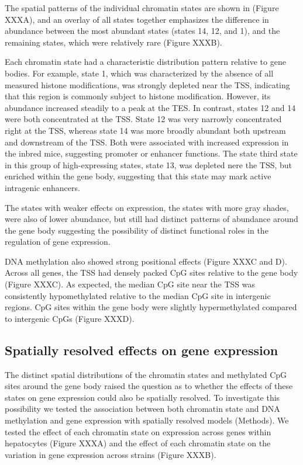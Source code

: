 \documentclass[10pt,letterpaper]{article}
\begin{document}
The spatial patterns of the individual chromatin states are shown in
(Figure XXXA), and an overlay of all states together emphasizes the
difference in abundance between the most abundant states (states 14, 12,
and 1), and the remaining states, which were relatively rare (Figure
XXXB).

Each chromatin state had a characteristic distribution pattern relative
to gene bodies. For example, state 1, which was characterized by the
absence of all measured histone modifications, was strongly depleted
near the TSS, indicating that this region is commonly subject to histone
modification. However, its abundance increased steadily to a peak at the
TES. In contrast, states 12 and 14 were both concentrated at the TSS.
State 12 was very narrowly concentrated right at the TSS, whereas state
14 was more broadly abundant both upstream and downstream of the TSS.
Both were associated with increased expression in the inbred mice,
suggesting promoter or enhancer functions. The state third state in this
group of high-expressing states, state 13, was depleted nere the TSS,
but enriched within the gene body, suggesting that this state may mark
active intragenic enhancers.

The states with weaker effects on expression, the states with more gray
shades, were also of lower abundance, but still had distinct patterns of
abundance around the gene body suggesting the possibility of distinct
functional roles in the regulation of gene expression.

DNA methylation also showed strong positional effects (Figure XXXC and
D). Across all genes, the TSS had densely packed CpG sites relative to
the gene body (Figure XXXC). As expected, the median CpG site near the
TSS was consistently hypomethylated relative to the median CpG site in
intergenic regions. CpG sites within the gene body were slightly
hypermethylated compared to intergenic CpGs (Figure XXXD).

\hypertarget{spatially-resolved-effects-on-gene-expression}{%
\subsection{Spatially resolved effects on gene
expression}\label{spatially-resolved-effects-on-gene-expression}}

The distinct spatial distributions of the chromatin states and
methylated CpG sites around the gene body raised the question as to
whether the effects of these states on gene expression could also be
spatially resolved. To investigate this possibility we tested the
association between both chromatin state and DNA methylation and gene
expression with spatially resolved models (Methods). We tested the
effect of each chromatin state on expression across genes within
hepatocytes (Figure XXXA) and the effect of each chromatin state on the
variation in gene expression across strains (Figure XXXB).
\end{document}
